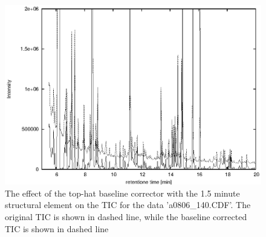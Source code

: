 \begin{figure}[htp]
\begin{center}
\includegraphics{graphics/pyms-test/tic_bc_tophat.eps}
\caption{The effect of the top-hat baseline corrector with the 1.5 minute
structural element on the TIC for the data 'a0806\_140.CDF'.  The original
TIC is shown in dashed line, while the baseline corrected TIC is shown in
dashed line}
\label{fig:bc-tophat}
\end{center}
\end{figure}

